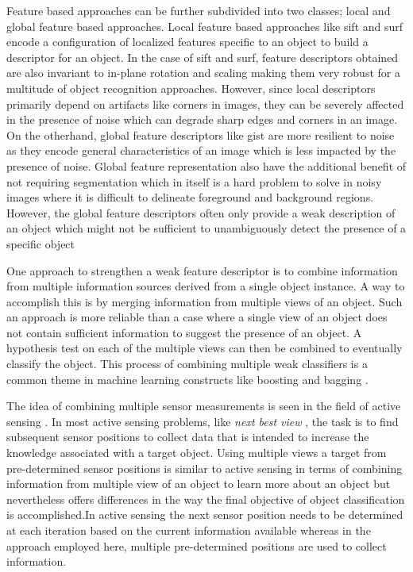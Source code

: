 \documentclass {udthesis}
\begin{document}
Feature based approaches can be further subdivided into two classes; local and global feature based approaches. Local feature based approaches like \gls{sift} \cite{sift} and \gls{surf} \cite{surf} encode a configuration of localized features specific to an object to build a descriptor for an object. In the case of \gls{sift} and \gls{surf}, feature descriptors obtained are also invariant to in-plane rotation and scaling making them very robust for a multitude of object recognition approaches. However, since local descriptors primarily depend on artifacts like corners in images, they can be severely affected in the presence of noise which can degrade sharp edges and corners in an image. On the otherhand, global feature descriptors like gist \cite{gist} are more resilient to noise as they encode general characteristics of an image which is less impacted by the presence of noise. Global feature representation also have the additional benefit of not requiring segmentation which in itself is a hard problem to solve in noisy images where it is difficult to delineate foreground and background regions. However, the global feature descriptors often only provide a weak description of an object which might not be sufficient to unambiguously detect the presence of a specific object

One approach to strengthen a weak feature descriptor is to combine information from multiple information sources derived from a single object instance. A way to accomplish this is by merging information from multiple views of an object. Such an approach is more reliable than a case where a single view of an object does not contain sufficient information to suggest the presence of an object. A hypothesis test on each of the multiple views can then be combined to eventually classify the object. This process of combining multiple weak classifiers is a common theme in machine learning constructs like boosting and bagging \cite{alpaydin}.

The idea of combining multiple sensor measurements is seen in the field of active sensing \cite{chen}. In most active sensing problems, like \emph{next best view} \cite{roy,dunn}, the task is to find subsequent sensor positions to collect data that is intended to increase the knowledge associated with a target object. Using multiple views a target from pre-determined sensor positions is similar to active sensing in terms of combining information from multiple view of an object to learn more about an object but nevertheless offers differences in the way the final objective of object classification is accomplished.In active sensing the next sensor position needs to be determined at each iteration based on the current information available whereas in the approach employed here, multiple pre-determined positions are used to collect information.
\end{document}

